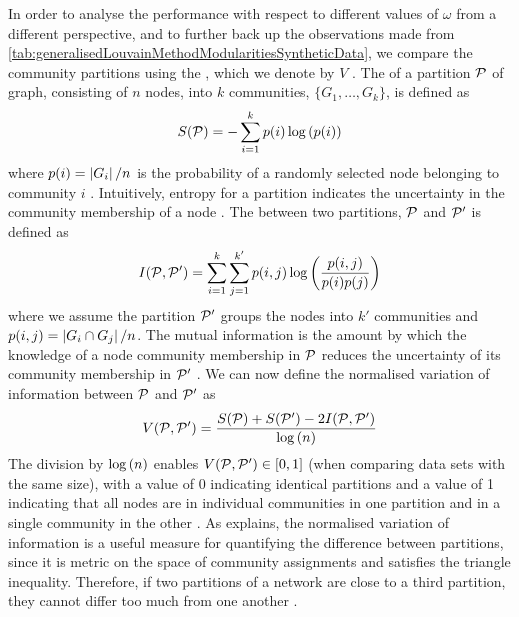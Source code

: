 In order to analyse the performance with respect to different values of $\omega$ from a different perspective, and to further back up the observations made from \cref{tab:generalisedLouvainMethodModularitiesSyntheticData}, we compare the community partitions using the , which we denote by $V$ \cite{MM03,FPM+10}.
The  of a partition $\mathcal P$ of graph, consisting of $n$ nodes, into $k$ communities, $\{ G_{1},\dots,G_{k} \}$, is defined as
\begin{equation}
	\label{eq:entropy}
	S(\mathcal P) = - \sum_{i=1}^{k} p(i) \log \left( p(i) \right)
\end{equation}
where $p(i) = \left\vert G_{i}\right\vert/n$ is the probability of a randomly selected node belonging to community $i$ \cite{MM03,FPM+10}.
Intuitively, entropy for a partition indicates the uncertainty in the community membership of a node \cite{FPM+10}.
The  between two partitions, $\mathcal P$ and $\mathcal P'$ is defined as
\begin{equation}
	\label{eq:mutualInformation}
	I(\mathcal P,\mathcal P') = \sum_{i=1}^{k} \sum_{j=1}^{k'} p(i,j) \log \left( \frac{p(i,j)}{p(i)p(j)} \right)
\end{equation}
where we assume the partition $\mathcal P'$ groups the nodes into $k'$ communities and $p(i,j) = \left\vert G_{i} \cap G_{j}\right\vert/n$.
The mutual information is the amount by which the knowledge of a node community membership in $\mathcal P$  reduces the uncertainty of its community membership in $\mathcal P'$ \cite{FPM+10}.
We can now define the normalised variation of information between $\mathcal P$ and $\mathcal P'$ as
\begin{equation}
	\label{eq:normalisedVariationOfInformation}
	V(\mathcal P,\mathcal P') = \frac{S(\mathcal P) + S(\mathcal P') - 2I(\mathcal P,\mathcal P')}{\log \left( n \right)}
\end{equation}
The division by $\log \left( n \right)$ enables $V(\mathcal P,\mathcal P') \in [0,1]$ (when comparing data sets with the same size), with a value of 0 indicating identical partitions and a value of 1 indicating that all nodes are in individual communities in one partition and in a single community in the other \cite{FPM+10}.
As \cite{FPM+10} explains, the normalised variation of information is a useful measure for quantifying the difference between partitions, since it is metric on the space of community assignments and satisfies the triangle inequality.
Therefore, if two partitions of a network are close to a third partition, they cannot differ too much from one another \cite{FPM+10}.
